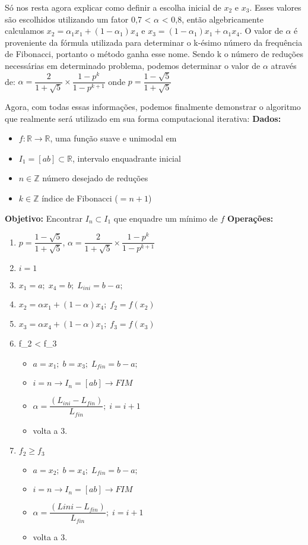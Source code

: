 Só nos resta agora explicar como definir a escolha inicial de $ x_2 $ e $ x_3 $. Esses valores são escolhidos utilizando um fator 0,7 < $\alpha$ < 0,8, então algebricamente calculamos $ x_2  =  \alpha_1  x_1  + (1 -  \alpha_1 ) x_4 $ e $ x_3  = (1 -  \alpha_1 ) x_1  +  \alpha_1  x_4 $.
O valor de $\alpha$ é proveniente da fórmula utilizada para determinar o k-ésimo número da frequência de Fibonacci, portanto o método ganha esse nome.
Sendo k o número de reduções necessárias em determinado problema, podemos determinar o valor de $\alpha$ através de:
$\alpha = \dfrac{2}{1+\sqrt{5}} \times \dfrac{1-p^k}{1-p^{k+1}}$ onde $p=\dfrac{1-\sqrt{5}}{1+\sqrt{5}}$

Agora, com todas essas informações, podemos finalmente demonstrar o algoritmo que realmente será utilizado em sua forma computacional iterativa:
\textbf{Dados:}
\begin{itemize}
	\item $f:\mathbb{R}\rightarrow\mathbb{R}$, uma função suave e unimodal em
	\item $I_1=[ab]\subset\mathbb{R}$, intervalo enquadrante inicial
	\item $n\in\mathbb{Z}$ número desejado de reduções
	\item $k\in\mathbb{Z}$ índice de Fibonacci ($=n+1$)
\end{itemize}
\textbf{Objetivo:} Encontrar $I_n \subset I_1$ que enquadre um mínimo de $f$
\textbf{Operações:}
\begin{enumerate}
	\item $p=\dfrac{1-\sqrt{5}}{1+\sqrt{5}}$, $\alpha = \dfrac{2}{1+\sqrt{5}} \times \dfrac{1-p^k}{1-p^{k+1}}$
	\item $i=1$
	\item $x_1=a;\; x_4=b;\; L_{ini}=b-a;$
	\item $x_2=\alpha x_1+(1-\alpha)x_4;\; f_2=f(x_2)$
	\item $x_3=\alpha x_4 + (1 - \alpha)x_1;\; f_3 = f(x_3)$
	\item f_2 < f_3
	\begin{itemize}
		\item $a=x_1;\; b=x_3;\; L_{fin}=b-a;$
		\item $i=n \rightarrow I_n = [ab] \rightarrow FIM$
		\item $\alpha = \dfrac{(L_{ini}-L_{fin})}{L_{fin}};\; i=i+1$
		\item volta a 3.
	\end{itemize}
	\item $f_2 \geq f_3$
	\begin{itemize}
		\item $a=x_2;\; b=x_4;\; L_{fin}=b-a;$
		\item $i=n \rightarrow I_n=[ab] \rightarrow FIM$
		\item $\alpha = \dfrac{(L{ini}-L_{fin})}{L_{fin}};\; i=i+1$
		\item volta a 3.
	\end{itemize}
\end{enumerate}




